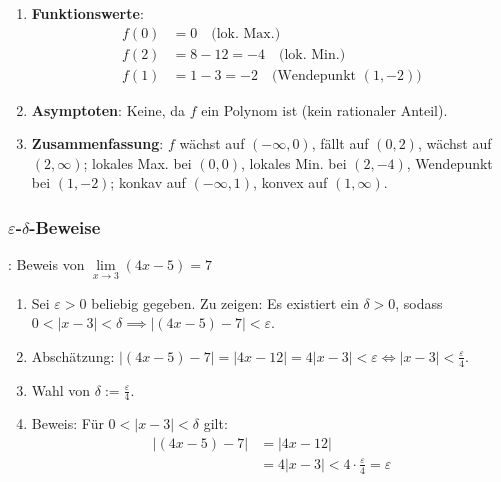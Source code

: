 \begin{minipage}{\linewidth}
\begin{enumerate}
    \item \textbf{Funktionswerte}:
    \begin{align*}
        f(0) &= 0 \quad \text{(lok. Max.)} \\[-0.3em]
        f(2) &= 8 - 12 = -4 \quad \text{(lok. Min.)} \\[-0.3em]
        f(1) &= 1 - 3 = -2 \quad \text{(Wendepunkt } (1, -2))
    \end{align*}

    \item \textbf{Asymptoten}: Keine, da $f$ ein Polynom ist (kein rationaler Anteil).

    \item \textbf{Zusammenfassung}: $f$ wächst auf $(-\infty, 0)$, fällt auf $(0, 2)$, wächst auf $(2, \infty)$;
    lokales Max. bei $(0, 0)$, lokales Min. bei $(2, -4)$, Wendepunkt bei $(1, -2)$;
    konkav auf $(-\infty, 1)$, konvex auf $(1, \infty)$.
\end{enumerate}
\end{minipage}

\subsubsection{\texorpdfstring{$\varepsilon$}{e}-\texorpdfstring{$\delta$}{d}-Beweise}

\Bsp {}: Beweis von $\lim\limits_{x\to 3} (4x - 5) = 7$
\begin{enumerate}
    \item Sei $\varepsilon > 0$ beliebig gegeben. Zu zeigen: Es existiert ein $\delta > 0$, sodass $0 < |x - 3| < \delta \implies |(4x - 5) - 7| < \varepsilon$.
    \item Abschätzung: $|(4x - 5) - 7| = |4x - 12| = 4|x - 3| < \varepsilon \iff |x - 3| < \frac{\varepsilon}{4}$.
    \item Wahl von $\delta := \frac{\varepsilon}{4}$.
    \item Beweis: Für $0 < |x - 3| < \delta$ gilt:
    \begin{align*}
        |(4x - 5) - 7| &= |4x - 12| \\[-0.4em]
                       &= 4|x - 3| < 4 \cdot \frac{\varepsilon}{4} = \varepsilon
    \end{align*}
\end{enumerate}

